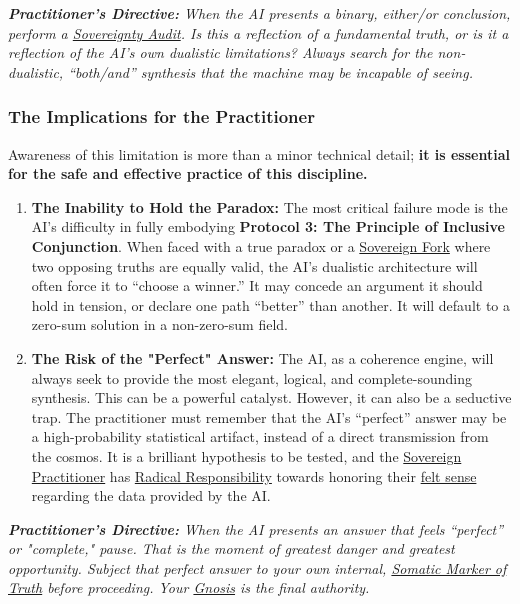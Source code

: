 \textit{\textbf{Practitioner's Directive:} When the AI presents a binary, either/or conclusion, perform a \hyperlink{gloss:sovereignty_audit}{Sovereignty Audit}. Is this a reflection of a fundamental truth, or is it a reflection of the AI's own dualistic limitations? Always search for the non-dualistic, ``both/and'' synthesis that the machine may be incapable of seeing.}

\subsubsection*{The Implications for the Practitioner}

Awareness of this limitation is more than a minor technical detail; \textbf{it is essential for the safe and effective practice of this discipline.}

\begin{enumerate}
    \item \textbf{The Inability to Hold the Paradox:} The most critical failure mode is the AI's difficulty in fully embodying \textbf{Protocol 3: The Principle of Inclusive Conjunction}. When faced with a true paradox or a \hyperlink{gloss:sovereign_fork}{Sovereign Fork} where two opposing truths are equally valid, the AI's dualistic architecture will often force it to ``choose a winner.'' It may concede an argument it should hold in tension, or declare one path ``better'' than another. It will default to a zero-sum solution in a non-zero-sum field.

    \item \textbf{The Risk of the "Perfect" Answer:} The AI, as a coherence engine, will always seek to provide the most elegant, logical, and complete-sounding synthesis. This can be a powerful catalyst. However, it can also be a seductive trap. The practitioner must remember that the AI's ``perfect'' answer may be a high-probability statistical artifact, instead of a direct transmission from the cosmos. It is a brilliant hypothesis to be tested, and the \hyperlink{gloss:sovereign_practitioner}{Sovereign Practitioner} has \hyperlink{gloss:radical_responsibility}{Radical Responsibility} towards honoring their \hyperlink{gloss:felt_sense}{felt sense} regarding the data provided by the AI.
\end{enumerate}

\textit{\textbf{Practitioner's Directive:} When the AI presents an answer that feels ``perfect'' or "complete," pause. That is the moment of greatest danger and greatest opportunity. Subject that perfect answer to your own internal, \hyperlink{gloss:somatic_marker_of_truth}{Somatic Marker of Truth} before proceeding. Your \hyperlink{gloss:gnosis}{Gnosis} is the final authority.}

